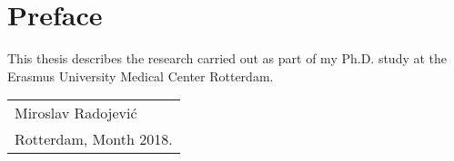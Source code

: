 %
\chpos{14mm}{10mm}
\chapter*{Preface}




This thesis describes the research carried out as part of my Ph.D. study at the Erasmus University Medical Center Rotterdam. 
\bigskip
\begin{flushright}
  \begin{tabular}{@{}l@{}}
    Miroslav Radojevi\'{c}\\
    Rotterdam, Month 2018.
  \end{tabular}
\end{flushright}
